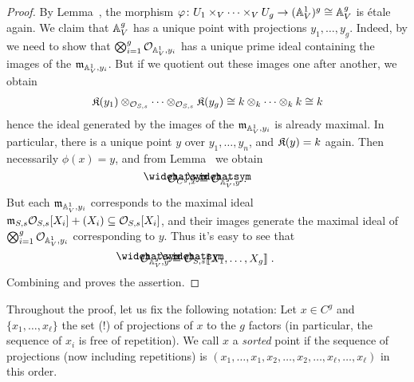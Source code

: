 \documentclass[a4paper,parskip=half,numbers=enddot, DIV=12]{scrreprt}
\begin{document}
\begin{proof}
	By Lemma~, the morphism $\phi\colon U_1\times_V\cdots\times_VU_g\morphism(\IA_V^1)^g\cong \IA_V^g$ is étale again. We claim that $\mathbb{A}_V^g$ has a unique point with projections $y_1,\ldots,y_g$. Indeed, by \cite[Proposition~1.3.2]{alggeo1} we need to show that $\bigotimes_{i=1}^g\mathcal{O}_{\mathbb{A}_V^1,y_i}$ has a unique prime ideal containing the images of the $\mathfrak{m}_{\mathbb{A}_V^1,y_i}$. But if we quotient out these images one after another, we obtain 
	\begin{align}\lbl{eq:manyks}
		\KK(y_1)\otimes_{\Oo_{S,s}}\cdots \otimes_{\Oo_{S,s}}\KK(y_g)\cong k\otimes_k\cdots\otimes_kk\cong k
	\end{align}
	hence the ideal generated by the images of the $\mathfrak{m}_{\mathbb{A}_V^1,y_i}$ is already maximal. In particular, there is a unique point $y$ over $y_1,\ldots,y_n$, and $\mathfrak{K}(y)=k$ again. Then necessarily $\phi(x)=y$, and from
	Lemma~ we obtain
	\begin{align}\lbl{eq:completion1}
		\roof{\Oo}_{C^g,x}\cong \roof{\Oo}_{\IA_V^g,y}\;.
	\end{align}
	But each $\mathfrak{m}_{\mathbb{A}_V^1,y_i}$ corresponds to the maximal ideal $\mathfrak{m}_{S,s}\mathcal{O}_{S,s}[X_i]+(X_i)\subseteq \mathcal{O}_{S,s}[X_i]$, and their images generate the maximal ideal of $\bigotimes_{i=1}^g\mathcal{O}_{\mathbb{A}_V^1,y_i}$ corresponding to $y$. Thus it's easy to see that
	\begin{align}\lbl{eq:completion2}
		\roof{\Oo}_{\IA_V^g,y}\cong \roof{\Oo}_{S,s}\llbracket X_1,\ldots,X_g\rrbracket\;.
	\end{align}
	Combining  and  proves the assertion.
\end{proof}
Throughout the proof, let us fix the following notation: Let $x\in C^g$ and $\{x_1,\ldots,x_\ell\}$ the set (!) of projections of $x$ to the $g$ factors (in particular, the sequence of $x_i$ is free of repetition). We call $x$ a \emph{sorted} point if the sequence of projections (now including repetitions) is $(x_1,\ldots,x_1,x_2,\ldots,x_2,\ldots,x_\ell,\ldots,x_\ell)$ in this order.
\end{document}
